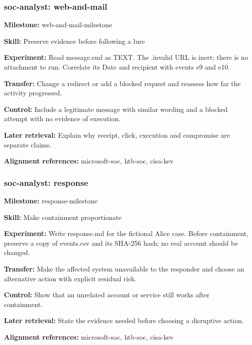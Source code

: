 \subsubsection{soc-analyst: web-and-mail}
\noindent\textbf{Milestone:} web-and-mail-milestone\par
\noindent\textbf{Skill:} Preserve evidence before following a lure\par
\noindent\textbf{Experiment:} Read message.eml as TEXT. The .invalid URL is inert; there is no attachment to run. Correlate its Date and recipient with events e9 and e10.\par
\noindent\textbf{Transfer:} Change a redirect or add a blocked request and reassess how far the activity progressed.\par
\noindent\textbf{Control:} Include a legitimate message with similar wording and a blocked attempt with no evidence of execution.\par
\noindent\textbf{Later retrieval:} Explain why receipt, click, execution and compromise are separate claims.\par
\noindent\textbf{Alignment references:} microsoft-soc, htb-soc, cisa-kev\par
\subsubsection{soc-analyst: response}
\noindent\textbf{Milestone:} response-milestone\par
\noindent\textbf{Skill:} Make containment proportionate\par
\noindent\textbf{Experiment:} Write response.md for the fictional Alice case. Before containment, preserve a copy of events.csv and its SHA-256 hash; no real account should be changed.\par
\noindent\textbf{Transfer:} Make the affected system unavailable to the responder and choose an alternative action with explicit residual risk.\par
\noindent\textbf{Control:} Show that an unrelated account or service still works after containment.\par
\noindent\textbf{Later retrieval:} State the evidence needed before choosing a disruptive action.\par
\noindent\textbf{Alignment references:} microsoft-soc, htb-soc, cisa-kev\par
